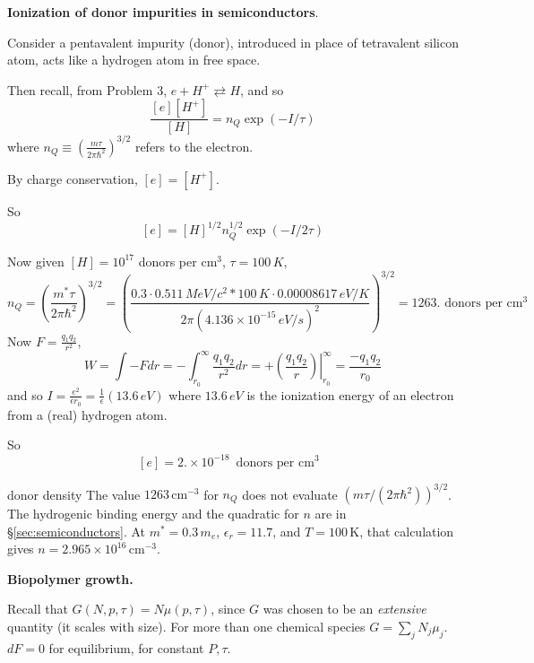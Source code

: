  \textbf{Ionization of donor impurities in semiconductors}.

Consider a pentavalent impurity (donor), introduced in place of tetravalent silicon atom, acts like a hydrogen atom in free space.  

Then recall, from Problem 3, $e + H^+ \rightleftarrows H$, and so 
\[
\frac{ [e][H^+]}{ [H] } =  n_Q  \exp{ (-I/\tau)}
\]
where $n_Q \equiv \left( \frac{ m\tau }{2\pi \hbar^2 } \right)^{3/2}$ refers to the electron.  

By charge conservation, $[e] = [H^+]$.  

So
\[
[e] = [H]^{1/2} n_Q^{1/2} \exp{ (-I/2\tau)}
\]

Now given $[H] = 10^{17}$ donors per $\text{cm}^3$,  $\tau = 100 \, K$, 
\[
n_Q = \left( \frac{m^* \tau}{2\pi \hbar^2 }\right)^{3/2} = \left( \frac{ 0.3 \cdot 0.511 \, MeV/c^2* 100 \, K \cdot 0.00008617 \, eV/K }{ 2 \pi (4.136 \times 10^{-15} \, eV/s)^2 } \right)^{3/2} = 1263. \text{ donors per $\text{cm}^3$ }
\]
Now $F = \frac{q_1q_2}{r^2}$, 
\[
W = \int -F dr = - \int_{r_0}^{\infty} \frac{q_1 q_2}{r^2} dr = + \left. \left( \frac{q_1 q_2 }{r} \right) \right|_{r_0}^{\infty} = \frac{-q_1 q_2}{r_0}
\]
and so $I = \frac{e^2}{\epsilon r_0} = \frac{1}{\epsilon}(13.6 \, eV)$ where $13.6 \, eV$ is the ionization energy of an electron from a (real) hydrogen atom. 

So
\[
[e]= 2. \times 10^{-18} \, \text{ donors per $\text{cm}^3$ }
\]
\begin{correction}{donor density}
The value $1263\,\mathrm{cm}^{-3}$ for $n_Q$ does not evaluate $(m\tau/(2\pi\hbar^2))^{3/2}$.
The hydrogenic binding energy and the quadratic for $n$ are in \S\ref{sec:semiconductors}.
At $m^{\!*}=0.3\, m_e$, $\epsilon_r = 11.7$, and $T=100\,\mathrm{K}$, that calculation gives $n = 2.965\times 10^{16}\,\mathrm{cm}^{-3}$.
\end{correction}
















 \textbf{Biopolymer growth.}  

Recall that $G(N,p,\tau) = N\mu(p,\tau)$, since $G$ was chosen to be an \emph{extensive} quantity (it scales with size).  For more than one chemical species $G = \sum_j N_j \mu_j$.  \\
$dF = 0$ for equilibrium, for constant $P,\tau$.   \quad \\ 

